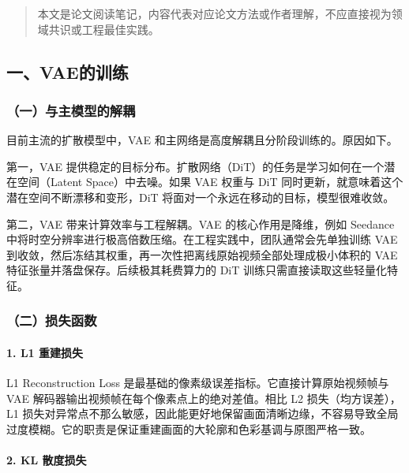 \begin{quote}
本文是论文阅读笔记，内容代表对应论文方法或作者理解，不应直接视为领域共识或工程最佳实践。
\end{quote}

\hypertarget{ux4e00vaeux7684ux8badux7ec3}{%
\subsection{一、VAE的训练}\label{ux4e00vaeux7684ux8badux7ec3}}

\hypertarget{ux4e00ux4e0eux4e3bux6a21ux578bux7684ux89e3ux8026}{%
\subsubsection{（一）与主模型的解耦}\label{ux4e00ux4e0eux4e3bux6a21ux578bux7684ux89e3ux8026}}

目前主流的扩散模型中，VAE 和主网络是高度解耦且分阶段训练的。原因如下。

第一，VAE 提供稳定的目标分布。扩散网络（DiT）的任务是学习如何在一个潜在空间（Latent Space）中去噪。如果 VAE 权重与 DiT 同时更新，就意味着这个潜在空间不断漂移和变形，DiT 将面对一个永远在移动的目标，模型很难收敛。

第二，VAE 带来计算效率与工程解耦。VAE 的核心作用是降维，例如 Seedance 中将时空分辨率进行极高倍数压缩。在工程实践中，团队通常会先单独训练 VAE 到收敛，然后冻结其权重，再一次性把离线原始视频全部处理成极小体积的 VAE 特征张量并落盘保存。后续极其耗费算力的 DiT 训练只需直接读取这些轻量化特征。

\hypertarget{ux4e8cux635fux5931ux51fdux6570-1}{%
\subsubsection{（二）损失函数}\label{ux4e8cux635fux5931ux51fdux6570-1}}

\hypertarget{l1-ux91cdux5efaux635fux5931}{%
\paragraph{1. L1 重建损失}\label{l1-ux91cdux5efaux635fux5931}}

L1 Reconstruction Loss 是最基础的像素级误差指标。它直接计算原始视频帧与 VAE 解码器输出视频帧在每个像素点上的绝对差值。相比 L2 损失（均方误差），L1 损失对异常点不那么敏感，因此能更好地保留画面清晰边缘，不容易导致全局过度模糊。它的职责是保证重建画面的大轮廓和色彩基调与原图严格一致。

\hypertarget{kl-ux6563ux5ea6ux635fux5931}{%
\paragraph{2. KL 散度损失}\label{kl-ux6563ux5ea6ux635fux5931}}

